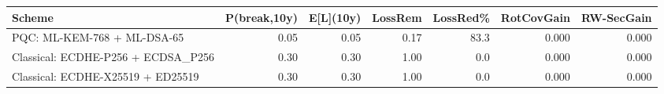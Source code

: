 \begin{tabular}{lrrrrrr}
\hline
Scheme & P(break,10y) & E[L](10y) & LossRem & LossRed\% & RotCovGain & RW-SecGain \\
\hline
PQC: ML-KEM-768 + ML-DSA-65 & 0.05 & 0.05 & 0.17 & 83.3 & 0.000 & 0.000 \\
Classical: ECDHE-P256 + ECDSA\_P256 & 0.30 & 0.30 & 1.00 & 0.0 & 0.000 & 0.000 \\
Classical: ECDHE-X25519 + ED25519 & 0.30 & 0.30 & 1.00 & 0.0 & 0.000 & 0.000 \\
\hline
\end{tabular}
